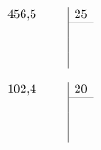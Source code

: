 	\begin{myexs}
		\begin{multicols}{2}
			\begin{center}
				$\begin{array}{rc|c}
				\num{456.5} \quad & & 25 \\
				\cline{3-3}
				&  \\
				& & \\
				& & \\
				\end{array}$
			\end{center}
			
			
			\begin{center}
				$\begin{array}{rc|c}
				\num{102.4} \quad & & 20 \\
				\cline{3-3}
				&  \\
				& & \\
				& & \\
				\end{array}$
				
			\end{center}
			
		\end{multicols}
	\end{myexs}
%
%		
%	
%
%	
%		
%				
%		
%		
%		

